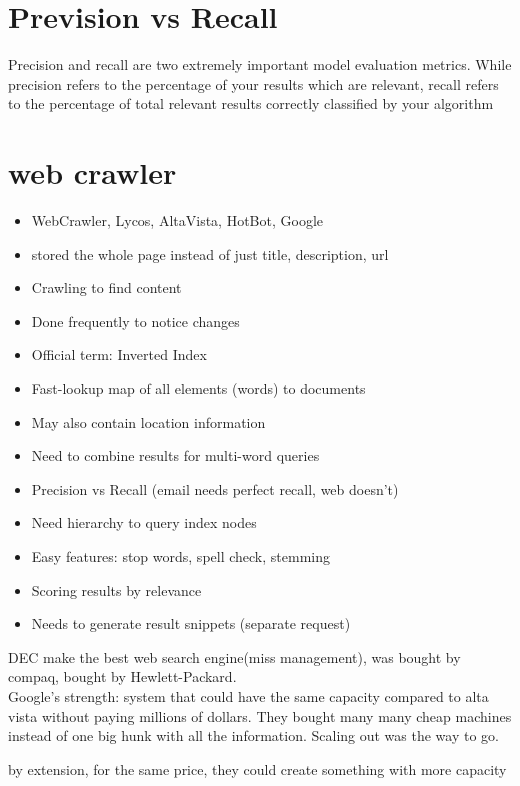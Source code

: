 \documentclass[fancy,11pt,titlestyle=display]{style/elegantbook}
\begin{document}
\section{Prevision vs Recall}{}
Precision and recall are two extremely important model evaluation metrics. While precision refers to the percentage of your results which are relevant, recall refers to the percentage of total relevant results correctly classified by your algorithm
\section{web crawler}{}

\begin{itemize}
    \item WebCrawler, Lycos, AltaVista, HotBot, Google 
    \item stored the whole page instead of just title, description, url
    \item Crawling to find content    \item Done frequently to notice changes
    \item Official term: Inverted Index
    \item Fast-lookup map of all elements (words) to documents
    \item May also contain location information
    \item Need to combine results for multi-word queries
    \item Precision vs Recall (email needs perfect recall, web doesn’t)
    \item Need hierarchy to query index nodes
    \item Easy features: stop words, spell check, stemming
    \item Scoring results by relevance
    \item Needs to generate result snippets (separate request)
\end{itemize}{}

DEC make the best web search engine(miss management), was bought by compaq, bought by Hewlett-Packard.\\

Google's strength: system that could have the same capacity compared to alta vista without paying millions of dollars. They bought many many cheap machines instead of one big hunk with all the information. Scaling out was the way to go. 

by extension, for the same price, they could create something with more capacity
\end{document}
